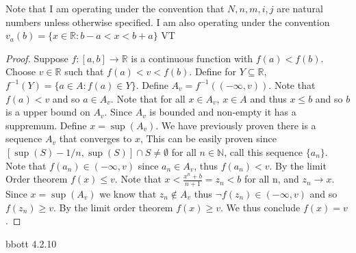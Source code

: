 \documentclass[12pt]{article}
\makeatletter
\theoremstyle{homework}
\newenvironment{exercise}[1]
{\def\@currentlabel{#1}\exercisecore}
{\endexercisecore}
\makeatother
\begin{document}
Note that I am operating under the convention that $N,n,m,i,j$ are natural numbers unless otherwise specified.  I am also operating under the convention $v_a(b)=\{x\in\mathbb{R}:b-a<x<b+a\}$
\begin{exercise}

IVT\\
\end{exercise}
\begin{proof}
Suppose $f:[a,b]\rightarrow \mathbb{R}$ is a continuous function with $f(a)<f(b)$.  Choose $v\in\mathbb{R}$ such that $f(a)<v<f(b)$.  Define for $Y\subseteq\mathbb{R}$, $f^{-1}(Y)=\{a\in A:f(a)\in Y\}$.  Define $A_v=f^{-1}((-\infty,v))$.  Note that $f(a)<v$ and so $a\in A_v$.  Note that for all $x\in A_v$, $x\in A$ and thus $x\leq b$ and so $b$ is a upper bound on $A_v$.  Since $A_v$ is bounded and non-empty it has a suppremum.  Define $x=\sup(A_v)$.  We have previously proven there is a sequence $A_v$ that converges to $x$, This can be easily proven since $[\sup(S)-1/n,\sup(S)]\cap S\neq \emptyset$ for all $n\in\mathbb{N}$, call this sequence $\{a_n\}$.  Note that $f(a_n)\in (-\infty,v)$ since $a_n\in A_v$, thus $f(a_n)<v$.  By the limit Order theorem $f(x)\leq v$.  Note that $x<\frac{x^n+b}{n+1}=z_n<b$ for all n, and $z_n\rightarrow x$.  Since $x=\sup(A_v)$ we know that $z_n\not\in A_v$ thus $\neg f(z_n)\in (-\infty,v)$ and so $f(z_n)\geq v$.  By the limit order theorem $f(x)\geq v$.  We thus conclude $f(x)=v$.
\end{proof}
\begin{exercise}

Abbott 4.2.10\\
\end{exercise}
\end{document}

